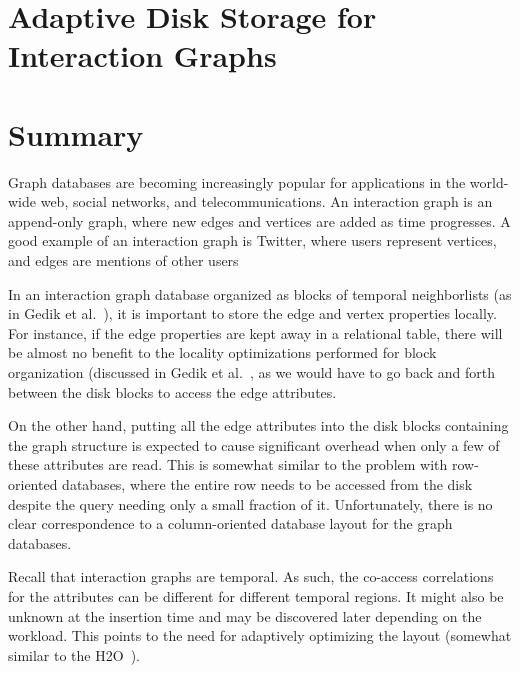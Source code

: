 \documentclass[11pt]{article}
\begin{document}


\section*{Adaptive Disk Storage for Interaction Graphs}

\section{Summary}

Graph databases are becoming increasingly popular for applications in the world-wide web, social networks, and telecommunications.  An interaction graph is an append-only graph, where new edges and vertices are added as time progresses. A good example of an interaction graph is Twitter, where users represent vertices, and edges are mentions of other users

%
In an interaction graph database organized as blocks of temporal neighborlists
(as in Gedik et al.~\cite{gedik14}), it is important to store the edge and vertex
properties locally. For  instance, if the edge properties are kept away in a
relational table, there will be almost no benefit to the locality
optimizations performed for block organization (discussed in Gedik et al.~\cite{gedik14}, as we would have to go back and forth between the disk blocks to
access the edge attributes.
%

On the other hand, putting all the edge attributes into the disk blocks
containing the graph structure is expected to cause significant overhead when
only a few of these attributes are read. This is somewhat similar to the
problem with row-oriented databases, where the entire row needs to be accessed
from the disk despite the query needing only a small fraction of it.
Unfortunately, there is no clear correspondence to a column-oriented database
layout for the graph databases.
%

Recall that interaction graphs are temporal. As such, the co-access
correlations for the attributes can be different for different temporal
regions. It might also  be unknown at the insertion time and may be discovered
later depending on the workload. This points to the need for adaptively
optimizing the layout (somewhat similar to the H2O~\cite{alagiannis14}).
%
\end{document}
